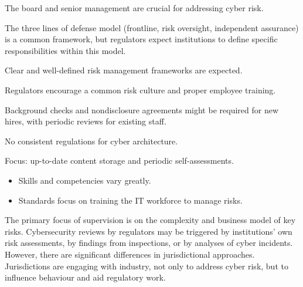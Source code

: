 \begin{lettered}
\item The board and senior management are crucial for addressing cyber risk.
\item The three lines of defense model (frontline, risk oversight, independent
assurance) is a common framework, but regulators expect institutions to define
specific responsibilities within this model.
\item Clear and well-defined risk management frameworks are expected.
\end{lettered}

\begin{lettered}
\item Regulators encourage a common risk culture and proper employee training.
\item Background checks and nondisclosure agreements might be required for new
hires, with periodic reviews for existing staff.
\end{lettered}

\begin{lettered}
\item No consistent regulations for cyber architecture.
\item Focus: up-to-date content storage and periodic self-assessments.
\end{lettered}

\begin{itemize}
\item Skills and competencies vary greatly.
\item Standards focus on training the IT workforce to manage risks.
\end{itemize}




The primary focus of supervision is on the complexity and business model of key
risks. Cybersecurity reviews by regulators may be triggered by institutions' own
risk assessments, by findings from inspections, or by analyses of cyber
incidents. However, there are significant differences in jurisdictional
approaches. Jurisdictions are engaging with industry, not only to address cyber
risk, but to influence behaviour and aid regulatory work.

